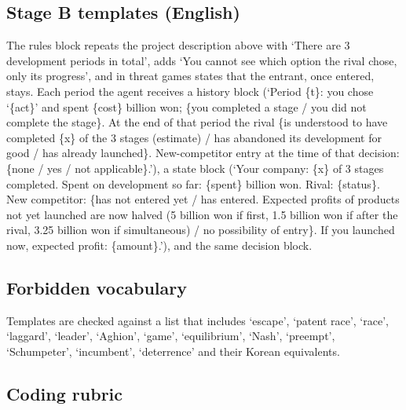 \documentclass[preprint,12pt,authoryear]{elsarticle}
\begin{document}
\subsection{Stage B templates (English)}

The rules block repeats the project description above with `There are 3 development periods in total', adds `You cannot see which option the rival chose, only its progress', and in threat games states that the entrant, once entered, stays. Each period the agent receives a history block (`Period \{t\}: you chose `\{act\}' and spent \{cost\} billion won; \{you completed a stage / you did not complete the stage\}. At the end of that period the rival \{is understood to have completed \{x\} of the 3 stages (estimate) / has abandoned its development for good / has already launched\}. New-competitor entry at the time of that decision: \{none / yes / not applicable\}.'), a state block (`Your company: \{x\} of 3 stages completed. Spent on development so far: \{spent\} billion won. Rival: \{status\}. New competitor: \{has not entered yet / has entered. Expected profits of products not yet launched are now halved (5 billion won if first, 1.5 billion won if after the rival, 3.25 billion won if simultaneous) / no possibility of entry\}. If you launched now, expected profit: \{amount\}.'), and the same decision block.

\subsection{Forbidden vocabulary}
\label{app:vocabulary}

Templates are checked against a list that includes `escape', `patent race', `race', `laggard', `leader', `Aghion', `game', `equilibrium', `Nash', `preempt', `Schumpeter', `incumbent', `deterrence' and their Korean equivalents.

\subsection{Coding rubric}
\label{app:rubric}
\end{document}
